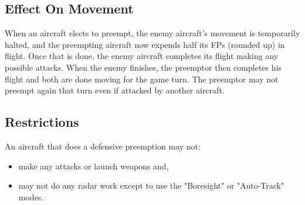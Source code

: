 \subsection{Effect On Movement} When an aircraft elects to preempt, the enemy aircraft's movement is temporarily halted, and the preempting aircraft now expends half its FPs (rounded up) in flight. Once that is done, the enemy aircraft completes its flight making any possible attacks. When the enemy finishes, the preemptor then completes his flight and both are done moving for the game turn. The preemptor may not preempt again that turn even if attacked by another aircraft. 

\subsection{Restrictions} An aircraft that does a defensive preemption may not:

\begin{itemize}
    \item make any attacks or launch weapons and,
    \item may not do any radar work except to use the "Boresight" or "Auto-Track" modes.
\end{itemize}


